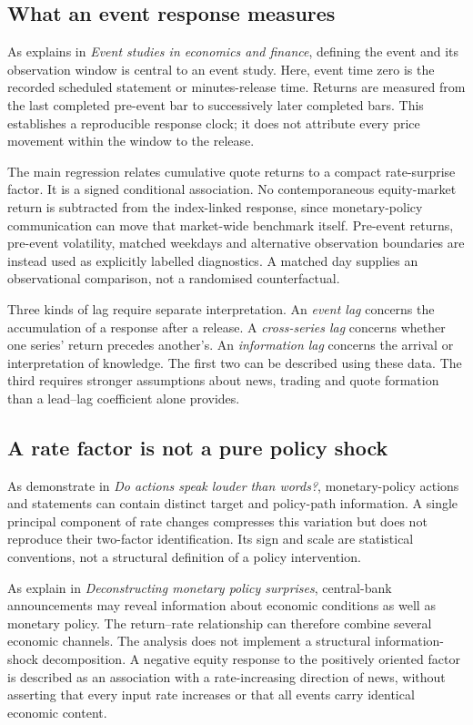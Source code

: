 \label{sec:framework}
\subsection{What an event response measures}
As  explains in \textit{Event studies in economics and finance}, defining the event and its observation window is central to an event study. Here, event time zero is the recorded scheduled statement or minutes-release time. Returns are measured from the last completed pre-event bar to successively later completed bars. This establishes a reproducible response clock; it does not attribute every price movement within the window to the release.

The main regression relates cumulative quote returns to a compact rate-surprise factor. It is a signed conditional association. No contemporaneous equity-market return is subtracted from the index-linked response, since monetary-policy communication can move that market-wide benchmark itself. Pre-event returns, pre-event volatility, matched weekdays and alternative observation boundaries are instead used as explicitly labelled diagnostics. A matched day supplies an observational comparison, not a randomised counterfactual.

Three kinds of lag require separate interpretation. An \textit{event lag} concerns the accumulation of a response after a release. A \textit{cross-series lag} concerns whether one series' return precedes another's. An \textit{information lag} concerns the arrival or interpretation of knowledge. The first two can be described using these data. The third requires stronger assumptions about news, trading and quote formation than a lead--lag coefficient alone provides.

\subsection{A rate factor is not a pure policy shock}
As  demonstrate in \textit{Do actions speak louder than words?}, monetary-policy actions and statements can contain distinct target and policy-path information. A single principal component of rate changes compresses this variation but does not reproduce their two-factor identification. Its sign and scale are statistical conventions, not a structural definition of a policy intervention.

As  explain in \textit{Deconstructing monetary policy surprises}, central-bank announcements may reveal information about economic conditions as well as monetary policy. The return--rate relationship can therefore combine several economic channels. The analysis does not implement a structural information-shock decomposition. A negative equity response to the positively oriented factor is described as an association with a rate-increasing direction of news, without asserting that every input rate increases or that all events carry identical economic content.

